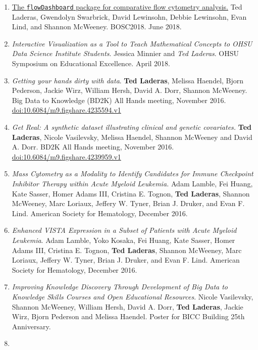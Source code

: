 \documentclass[11pt,]{article}
\begin{document}
\begin{enumerate}
\def\labelenumi{\arabic{enumi}.}
\item
  \href{http://laderast.github.io/talks/flowDashboard.pdf}{The
  \texttt{flowDashboard} package for comparative flow cytometry
  analysis.} Ted Laderas, Gwendolyn Swarbrick, David Lewinsohn, Debbie
  Lewinsohn, Evan Lind, and Shannon McWeeney. BOSC2018. June 2018.
\item
  \emph{Interactive Visualization as a Tool to Teach Mathematical
  Concepts to OHSU Data Science Institute Students}. Jessica Minnier and
  \emph{Ted Laderas}. OHSU Symposium on Educational Excellence. April
  2018.
\item
  \emph{Getting your hands dirty with data}. \textbf{Ted Laderas},
  Melissa Haendel, Bjorn Pederson, Jackie Wirz, William Hersh, David A.
  Dorr, Shannon McWeeney. Big Data to Knowledge (BD2K) All Hands
  meeting, November 2016.
  \href{https://doi.org/10.6084/m9.figshare.4235594.v1}{doi:10.6084/m9.figshare.4235594.v1}
\item
  \emph{Get Real: A synthetic dataset illustrating clinical and genetic
  covariates.} \textbf{Ted Laderas}, Nicole Vasilevsky, Melissa Haendel,
  Shannon McWeeney and David A. Dorr. BD2K All Hands meeting, November
  2016.
  \href{https://doi.org/10.6084/m9.figshare.4239959.v1}{doi:10.6084/m9.figshare.4239959.v1}
\item
  \emph{Mass Cytometry as a Modality to Identify Candidates for Immune
  Checkpoint Inhibitor Therapy within Acute Myeloid Leukemia.} Adam
  Lamble, Fei Huang, Kate Sasser, Homer Adams III, Cristina E. Tognon,
  \textbf{Ted Laderas}, Shannon McWeeney, Marc Loriaux, Jeffery W.
  Tyner, Brian J. Druker, and Evan F. Lind. American Society for
  Hematology, December 2016.
\item
  \emph{Enhanced VISTA Expression in a Subset of Patients with Acute
  Myeloid Leukemia}. Adam Lamble, Yoko Kosaka, Fei Huang, Kate Sasser,
  Homer Adams III, Cristina E. Tognon, \textbf{Ted Laderas}, Shannon
  McWeeney, Marc Loriaux, Jeffery W. Tyner, Brian J. Druker, and Evan F.
  Lind. American Society for Hematology, December 2016.
\item
  \emph{Improving Knowledge Discovery Through Development of Big Data to
  Knowledge Skills Courses and Open Educational Resources}. Nicole
  Vasilevsky, Shannon McWeeney, William Hersh, David A. Dorr,
  \textbf{Ted Laderas}, Jackie Wirz, Bjorn Pederson and Melissa Haendel.
  Poster for BICC Building 25th Anniversary.
\item

\end{enumerate}
\end{document}
